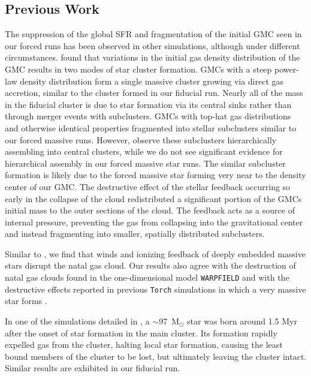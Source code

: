 \documentclass[twoside]{drexel-thesis}
\begin{document}
\begin{thesis}
\subsection{Previous Work}\label{sec:PrevWork}
The suppression of the global SFR and fragmentation of the initial GMC seen in our forced runs has been observed in other simulations, although under different circumstances. \citet{chen_effects_2021} found that variations in the initial gas density distribution of the GMC results in two modes of star cluster formation. GMCs with a steep power-law density distribution form a single massive cluster growing via direct gas accretion, similar to the cluster formed in our fiducial run. Nearly all of the mass in the fiducial cluster is due to star formation via its central sinks rather than through merger events with subclusters.
GMCs with top-hat gas distributions and otherwise identical properties fragmented into stellar subclusters similar to our forced massive runs. However, \citet{chen_effects_2021} observe these subclusters hierarchically assembling into central clusters, while we do not see significant evidence for hierarchical assembly in our forced massive star runs. 
The similar subcluster formation is likely due to the forced massive star forming very near to the density center of our GMC. The destructive effect of the stellar feedback occurring so early in the collapse of the cloud redistributed a significant portion of the GMCs initial mass to the outer sections of the cloud. The feedback acts as a source of internal pressure, preventing the gas from collapsing into the gravitational center and instead fragmenting into smaller, spatially distributed subclusters.

Similar to \citet{dale_before_2014}, we find that winds and ionizing feedback of deeply embedded massive stars disrupt the natal gas cloud. Our results also agree with the destruction of natal gas clouds found in the one-dimensional model \texttt{WARPFIELD}
\citep{rahner_warpfield_2019} and with the destructive effects reported in previous \texttt{Torch} simulations in which a very massive star forms \citep{wall_modeling_2020}.

In one of the simulations detailed in \citet{wall_modeling_2020}, a $\sim$97~M$_{\odot}$ star was born around 1.5 Myr after the onset of star formation in the main cluster. Its formation rapidly expelled gas from the cluster, halting local star formation, causing the least bound members of the cluster to be lost, but ultimately leaving the cluster intact. Similar results are exhibited in our fiducial run.


\end{thesis}
\end{document}
